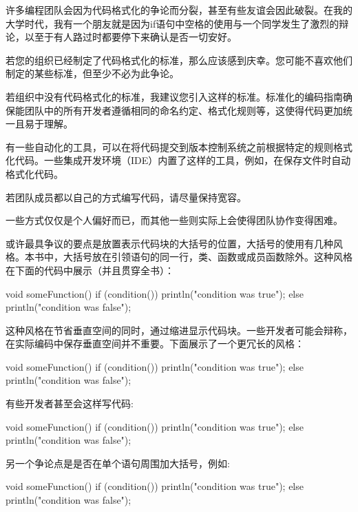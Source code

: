 
许多编程团队会因为代码格式化的争论而分裂，甚至有些友谊会因此破裂。在我的大学时代，我有一个朋友就是因为if语句中空格的使用与一个同学发生了激烈的辩论，以至于有人路过时都要停下来确认是否一切安好。

若您的组织已经制定了代码格式化的标准，那么应该感到庆幸。您可能不喜欢他们制定的某些标准，但至少不必为此争论。

若组织中没有代码格式化的标准，我建议您引入这样的标准。标准化的编码指南确保能团队中的所有开发者遵循相同的命名约定、格式化规则等，这使得代码更加统一且易于理解。

有一些自动化的工具，可以在将代码提交到版本控制系统之前根据特定的规则格式化代码。一些集成开发环境（IDE）内置了这样的工具，例如，在保存文件时自动格式化代码。

若团队成员都以自己的方式编写代码，请尽量保持宽容。

一些方式仅仅是个人偏好而已，而其他一些则实际上会使得团队协作变得困难。


或许最具争议的要点是放置表示代码块的大括号的位置，大括号的使用有几种风格。本书中，大括号放在引领语句的同一行，类、函数或成员函数除外。这种风格在下面的代码中展示（并且贯穿全书）：

\begin{cpp}
void someFunction()
{
    if (condition()) {
        println("condition was true");
    } else {
        println("condition was false");
    }
}
\end{cpp}

这种风格在节省垂直空间的同时，通过缩进显示代码块。一些开发者可能会辩称，在实际编码中保存垂直空间并不重要。下面展示了一个更冗长的风格：

\begin{cpp}
void someFunction()
{
    if (condition())
    {
        println("condition was true");
    }
    else
    {
        println("condition was false");
    }
}
\end{cpp}

有些开发者甚至会这样写代码:

\begin{cpp}
void someFunction()
{
    if (condition())
        {
            println("condition was true");
        }
    else
        {
            println("condition was false");
        }
}
\end{cpp}

另一个争论点是是否在单个语句周围加大括号，例如:

\begin{cpp}
void someFunction()
{
    if (condition())
        println("condition was true");
    else
        println("condition was false");
}
\end{cpp}


